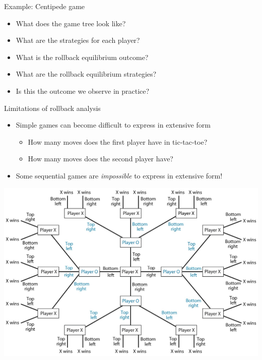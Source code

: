 \documentclass[10pt]{beamer}
\begin{document}
\begin{frame}[label={sec:orgb73dc76}]{}
\alert{Example: Centipede game}
\begin{itemize}
\item What does the game tree look like?
\item What are the strategies for each player?
\item What is the rollback equilibrium outcome?
\item What are the rollback equilibrium strategies?
\item Is this the outcome we observe in practice?
\end{itemize}
\end{frame}

\begin{frame}[label={sec:orgb0d06de}]{}
\alert{Limitations of rollback analysis} 
\begin{itemize}
\item Simple games can become difficult to express in extensive form 
\begin{itemize}
\item How many moves does the first player have in tic-tac-toe?
\item How many moves does the second player have?
\end{itemize}
\item Some sequential games are \emph{impossible} to express in extensive form!
\end{itemize}
\end{frame}

\begin{frame}[label={sec:orgd4d9770}]{}
\begin{center}
\includegraphics[width=.75\textwidth]{./img/GAMES4_FIG03.07.jpg}
\end{center}
\end{frame}
\end{document}
